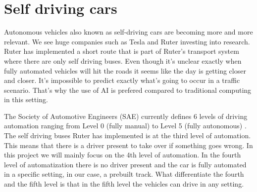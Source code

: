 \section{Self driving cars}
Autonomous vehicles also known as self-driving cars are becoming more and more relevant. We see huge companies such as Tesla and Ruter investing into research. Ruter has implemented a short route that is part of Ruter’s transport system where there are only self driving buses. Even though it’s unclear exactly when fully automated vehicles will hit the roads it seems like the day is getting closer and closer. It’s impossible to predict exactly what's going to occur in a traffic scenario. That’s why the use of AI is prefered compared to traditional computing in this setting. 

The Society of Automotive Engineers (SAE) currently defines 6 levels of driving automation ranging from Level 0 (fully manual) to Level 5 (fully autonomous) \parencite{synopsys_autonomous_car}. The self driving buses Ruter has implemented is at the third level of automation. This means that there is a driver present to take over if something goes wrong. In this project we will mainly focus on the 4th level of automation. In the fourth level of automatization there is no driver present and the car is fully automated in a specific setting, in our case, a prebuilt track. What differentiate the fourth and the fifth level is that in the fifth level the vehicles can drive in any setting.